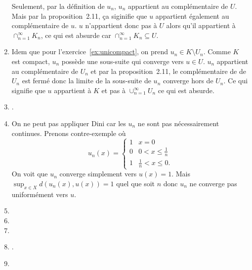 \begin{enumerate}
    Seulement, par la définition de $u_n$, $u_n$ appartient au complémentaire de $U$.
    Mais par la proposition~2.11, ça siginifie que $u$ appartient également au complémentaire de $u$.
    $u$ n'appartient donc pas à $U$ alors qu'il appartient à $\cap_{n=1}^\infty K_n$,
    ce qui est absurde car $\cap_{n=1}^\infty K_n \subseteq U$.
  \item Idem que pour l'exercice~\ref{ex:unicompact},
    on prend $u_n \in K \setminus U_n$.
    Comme $K$ est compact, $u_n$ possède une sous-suite qui converge vers $u \in U$.
    $u_n$ appartient au complémentaire de $U_n$ et
    par la proposition~2.11, le complémentaire de de $U_n$ est fermé donc la limite
    de la sous-suite de $u_n$ converge hors de $U_n$.
    Ce qui signifie que $u$ appartient à $K$ et pas à $\cup_{n=1}^\infty U_n$ ce
    qui est absurde.
  \item {}.   %
  \item On ne peut pas appliquer Dini car les $u_n$ ne sont pas nécessairement continues.
    Prenons contre-exemple où
    \[ u_n(x) =
      \begin{cases}
        1 & x = 0\\
        0 & 0 < x \leq \frac{1}{n}\\
        1 & \frac{1}{n} < x \leq 0.
      \end{cases}
    \]
    On voit que $u_n$ converge simplement vers $u(x) = 1$.
    Mais $\sup_{x \in X} d(u_n(x), u(x)) = 1$ quel que soit $n$
    donc $u_n$ ne converge pas uniformément vers $u$.
  \item
    \nosolution
  \item
    \nosolution
  \item
    \nosolution
  \item {}.   %
  \item
    \nosolution
\end{enumerate}





